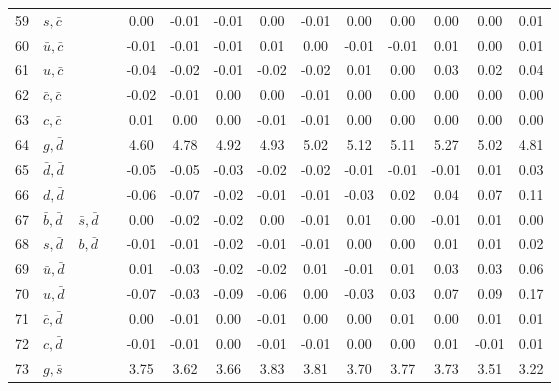 \begin{tabularx}{\textwidth}{rXXX@{}S@{}S@{}S@{}S@{}S@{}S@{}S@{}S@{}S@{}S}
 59 & $s, \bar c$      &                   &                  &  0.00 & -0.01 & -0.01 &  0.00 & -0.01 &  0.00 &  0.00 &  0.00 &  0.00 &  0.01 \\
 60 & $\bar u, \bar c$ &                   &                  & -0.01 & -0.01 & -0.01 &  0.01 &  0.00 & -0.01 & -0.01 &  0.01 &  0.00 &  0.01 \\
 61 & $u, \bar c$      &                   &                  & -0.04 & -0.02 & -0.01 & -0.02 & -0.02 &  0.01 &  0.00 &  0.03 &  0.02 &  0.04 \\
 62 & $\bar c, \bar c$ &                   &                  & -0.02 & -0.01 &  0.00 &  0.00 & -0.01 &  0.00 &  0.00 &  0.00 &  0.00 &  0.00 \\
 63 & $c, \bar c$      &                   &                  &  0.01 &  0.00 &  0.00 & -0.01 & -0.01 &  0.00 &  0.00 &  0.00 &  0.00 &  0.00 \\
 64 & $g, \bar d$      &                   &                  &  4.60 &  4.78 &  4.92 &  4.93 &  5.02 &  5.12 &  5.11 &  5.27 &  5.02 &  4.81 \\
 65 & $\bar d, \bar d$ &                   &                  & -0.05 & -0.05 & -0.03 & -0.02 & -0.02 & -0.01 & -0.01 & -0.01 &  0.01 &  0.03 \\
 66 & $d, \bar d$      &                   &                  & -0.06 & -0.07 & -0.02 & -0.01 & -0.01 & -0.03 &  0.02 &  0.04 &  0.07 &  0.11 \\
 67 & $\bar b, \bar d$ & $\bar s, \bar d$  &                  &  0.00 & -0.02 & -0.02 &  0.00 & -0.01 &  0.01 &  0.00 & -0.01 &  0.01 &  0.00 \\
 68 & $s, \bar d$      & $b, \bar d$       &                  & -0.01 & -0.01 & -0.02 & -0.01 & -0.01 &  0.00 &  0.00 &  0.01 &  0.01 &  0.02 \\
 69 & $\bar u, \bar d$ &                   &                  &  0.01 & -0.03 & -0.02 & -0.02 &  0.01 & -0.01 &  0.01 &  0.03 &  0.03 &  0.06 \\
 70 & $u, \bar d$      &                   &                  & -0.07 & -0.03 & -0.09 & -0.06 &  0.00 & -0.03 &  0.03 &  0.07 &  0.09 &  0.17 \\
 71 & $\bar c, \bar d$ &                   &                  &  0.00 & -0.01 &  0.00 & -0.01 &  0.00 &  0.00 &  0.01 &  0.00 &  0.01 &  0.01 \\
 72 & $c, \bar d$      &                   &                  & -0.01 & -0.01 &  0.00 & -0.01 & -0.01 &  0.00 &  0.00 &  0.01 & -0.01 &  0.01 \\
 73 & $g, \bar s$      &                   &                  &  3.75 &  3.62 &  3.66 &  3.83 &  3.81 &  3.70 &  3.77 &  3.73 &  3.51 &  3.22 \\

\end{tabularx}
